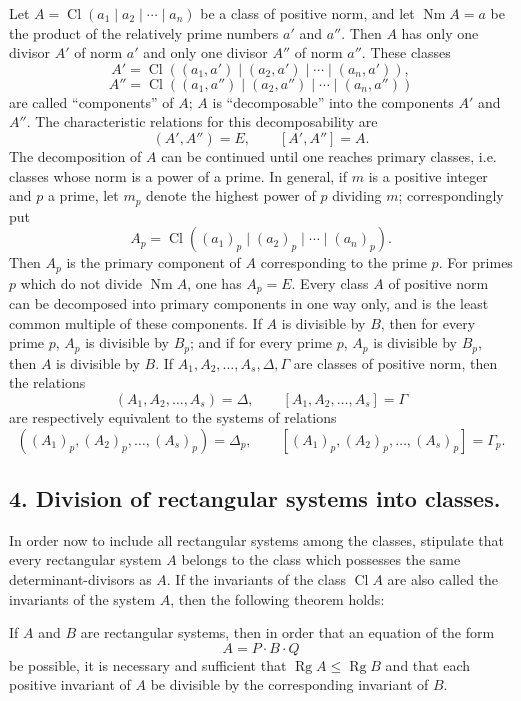 \documentclass[11pt,a4paper]{article}
\newcommand{\Cl}{\operatorname{Cl}}
\newcommand{\Nm}{\operatorname{Nm}}
\newcommand{\Rg}{\operatorname{Rg}}
\begin{document}
Let $A=\Cl(a_1\mid a_2\mid\cdots\mid a_n)$ be a class of positive norm, and let $\Nm A=a$ be the product of the relatively prime numbers $a'$ and $a''$. Then $A$ has only one divisor $A'$ of norm $a'$ and only one divisor $A''$ of norm $a''$. These classes
\[
 A'=\Cl((a_1,a')\mid(a_2,a')\mid\cdots\mid(a_n,a')),
\]
\[
 A''=\Cl((a_1,a'')\mid(a_2,a'')\mid\cdots\mid(a_n,a''))
\]
are called ``components'' of $A$; $A$ is ``decomposable'' into the components $A'$ and $A''$. The characteristic relations for this decomposability are
\[
 (A',A'')=E,
 \qquad [A',A'']=A.
\]
The decomposition of $A$ can be continued until one reaches primary classes, i.e. classes whose norm is a power of a prime. In general, if $m$ is a positive integer and $p$ a prime, let $m_p$ denote the highest power of $p$ dividing $m$; correspondingly put
\[
 A_p=\Cl((a_1)_p\mid(a_2)_p\mid\cdots\mid(a_n)_p).
\]
Then $A_p$ is the primary component of $A$ corresponding to the prime $p$. For primes $p$ which do not divide $\Nm A$, one has $A_p=E$. Every class $A$ of positive norm can be decomposed into primary components in one way only, and is the least common multiple of these components. If $A$ is divisible by $B$, then for every prime $p$, $A_p$ is divisible by $B_p$; and if for every prime $p$, $A_p$ is divisible by $B_p$, then $A$ is divisible by $B$. If $A_1,A_2,\ldots,A_s,\Delta,\Gamma$ are classes of positive norm, then the relations
\[
 (A_1,A_2,\ldots,A_s)=\Delta,
 \qquad [A_1,A_2,\ldots,A_s]=\Gamma
\]
are respectively equivalent to the systems of relations
\[
 ((A_1)_p,(A_2)_p,\ldots,(A_s)_p)=\Delta_p,
 \qquad [(A_1)_p,(A_2)_p,\ldots,(A_s)_p]=\Gamma_p.
\]

\subsection*{4. Division of rectangular systems into classes.}

In order now to include all rectangular systems among the classes, stipulate that every rectangular system $A$ belongs to the class which possesses the same determinant-divisors as $A$. If the invariants of the class $\Cl A$ are also called the invariants of the system $A$, then the following theorem holds:

If $A$ and $B$ are rectangular systems, then in order that an equation of the form
\[
 A=P\cdot B\cdot Q
\]
be possible, it is necessary and sufficient that $\Rg A\le\Rg B$ and that each positive invariant of $A$ be divisible by the corresponding invariant of $B$.
\end{document}
